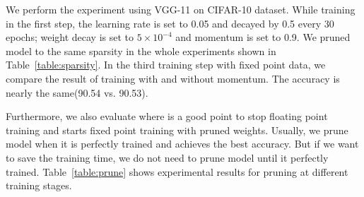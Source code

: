 We perform the experiment using VGG-11\cite{Simonyan2014Very} on CIFAR-10\cite{krizhevsky2009learning} dataset. While training in the first step, the learning rate is set to 0.05 and decayed by 0.5 every 30 epochs; weight decay is set to $5 \times 10^{-4}$ and momentum is set to 0.9. We pruned model to the same sparsity in the whole experiments shown in Table~\ref{table:sparsity}. In the third training step with fixed point data, we compare the result of training with and without momentum. The accuracy is nearly the same(90.54 vs. 90.53). 

Furthermore, we also evaluate where is a good point to stop floating point training and starts fixed point training with pruned weights. Usually, we prune model when it is perfectly trained and achieves the best accuracy. But if we want to save the training time, we do not need to prune model until it perfectly trained. Table~\ref{table:prune} shows experimental results for pruning at different training stages. 

